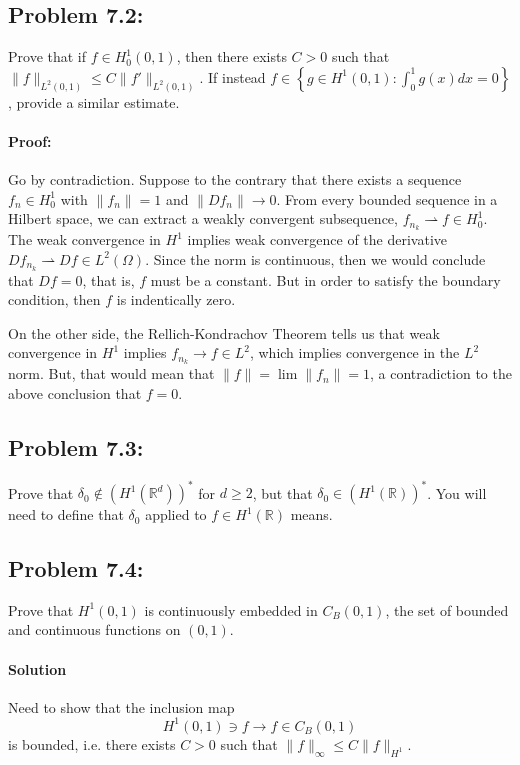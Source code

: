 \documentclass[letterpaper,twoside,11pt]{article}
\theoremstyle{mystyle}
\newcommand{\R}{{\mathbb R}}
\begin{document}
\newpage 
\subsection*{Problem 7.2:}
Prove that if $f \in H_0^1\left( 0,1 \right)$, then there exists $C>0$ such that $\|f\|_{L^2(0,1)} \leq C \|f'\|_{L^2(0,1)}$. 
If instead $f \in \left\{ g \in H^1(0,1) : \int_0^1 g(x) dx = 0 \right\}$, provide a similar estimate. 

\paragraph*{Proof: }
Go by contradiction. Suppose to the contrary that there exists a sequence $f_n \in H_0^1$ with $\|f_n\|=1$ and $\|Df_n\|\to 0$. From every bounded sequence in a Hilbert space, we can extract a weakly convergent subsequence, $f_{n_k} \rightharpoonup f \in H_0^1$. The weak convergence in $H^1$ implies weak convergence of the derivative $Df_{n_k} \rightharpoonup Df \in L^2\left( \Omega \right)$. Since the norm is continuous, then we would conclude that $Df = 0$, that is, $f$ must be a constant. But in order to satisfy the boundary condition, then $f$ is indentically zero. 

On the other side, the Rellich-Kondrachov Theorem tells us that weak convergence in $H^1$ implies $f_{n_k} \to f \in L^2$, which implies convergence in the $L^2$ norm. But, that would mean that $\|f\| = \lim \|f_n\| = 1$, a contradiction to the above conclusion that $f = 0$. 













\newpage 
\subsection*{Problem 7.3:}
Prove that $\delta_0 \notin \left( H^1\left( \R^d \right) \right)^*$ for $d \geq 2$, but that $\delta_0 \in \left( H^1\left( \R \right) \right)^*$. You will need to define that $\delta_0$ applied to $f \in H^1\left( \R \right)$ means. 



\subsection*{Problem 7.4:}
Prove that $H^1(0,1)$ is continuously embedded in $C_B(0,1)$, the set of bounded and continuous functions on $(0,1)$. 

\paragraph*{Solution} Need to show that the inclusion map 
\[H^1\left( 0,1 \right) \ni f \to f \in C_B\left( 0,1 \right)\] 
is bounded, i.e. there exists $C>0$ such that $\|f\|_{\infty} \leq C \|f\|_{H^1}$.
\end{document}
